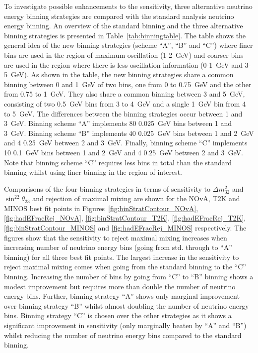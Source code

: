 To investigate possible enhancements to the sensitivity, three
alternative neutrino energy binning strategies are compared with the
standard analysis neutrino energy binning. An overview of the standard
binning and the three alternative binning strategies is presented in
Table~\ref{tab:binningtable}.  
The table shows the general idea of the new binning strategies (scheme
``A'', ``B'' and ``C'') where finer bins are used in the region of
maximum oscillation (1-2~GeV) and coarser bins are used in the region
where there is less oscillation information (0-1~GeV and 3-5~GeV).
As shown in the table, the new binning strategies share a common
binning between 0 and 1~GeV of two bins, one from 0 to 0.75~GeV and
the other from 0.75 to 1~GeV. 
They also share a common binning between 3 and 5~GeV,
consisting of two 0.5~GeV bins from 3 to 4~GeV and a single 1~GeV bin
from 4 to 5~GeV.
The differences between the binning strategies occur between 1 and
3~GeV. Binning scheme ``A'' implements 80 0.025~GeV bins between 1 and
3~GeV.  
Binning scheme ``B'' implements 40 0.025~GeV bins between 1 and 2~GeV
and 4 0.25~GeV between 2 and 3~GeV. 
Finally, binning scheme ``C'' implements 10 0.1~GeV bins between 1 and
2~GeV and 4 0.25~GeV between 2 and 3~GeV. Note that binning scheme
``C'' requires less bins in total than the standard binning whilst using finer
binning in the region of interest.

Comparisons of the four binning strategies in terms of sensitivity to
$\Delta m^2_{32}$ and $\sin^22\theta_{23}$ and rejection of maximal
mixing are shown for the NOvA, T2K and MINOS best fit points in
Figures~\ref{fig:binStratContour_NOvA}, \ref{fig:hadEFracRej_NOvA},
\ref{fig:binStratContour_T2K}, \ref{fig:hadEFracRej_T2K},
\ref{fig:binStratContour_MINOS} and \ref{fig:hadEFracRej_MINOS}
respectively. The figures show that the sensitivity to reject maximal
mixing increases when increasing number of neutrino energy bins (going
from std. through to ``A'' binning) for all three best fit points. The
largest increase in the sensitivity to reject maximal mixing comes
when going from the standard binning to the ``C'' binning. 
Increasing the number of bins by going from ``C'' to 
``B'' binning shows a modest improvement but requires more than double the
number of neutrino energy bins. Further, binning strategy ``A'' shows
only marginal improvement over binning strategy ``B'' whilst almost
doubling the number of neutrino energy bins. 
Binning strategy ``C'' is chosen over the other strategies as it shows
a significant improvement in sensitivity (only marginally beaten by
``A'' and ``B'') whilst reducing the number of neutrino energy bins
compared to the standard binning.


